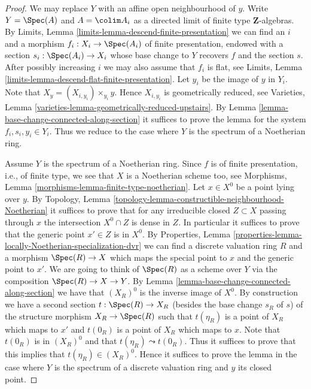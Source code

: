 \begin{proof}
We may replace $Y$ with an affine open neighbourhood of $y$.
Write $Y = \Spec(A)$ and $A = \colim A_i$ as a directed
limit of finite type $\mathbf{Z}$-algebras. By
Limits, Lemma \ref{limits-lemma-descend-finite-presentation}
we can find an $i$ and a morphism $f_i : X_i \to \Spec(A_i)$ of
finite presentation, endowed with a section $s_i : \Spec(A_i) \to X_i$
whose base change to $Y$ recovers $f$ and the section $s$.
After possibly increasing $i$ we may also assume that $f_i$ is flat, see
Limits, Lemma \ref{limits-lemma-descend-flat-finite-presentation}.
Let $y_i$ be the image of $y$ in $Y_i$. Note that
$X_y = (X_{i, y_i}) \times_{y_i} y$. Hence $X_{i, y_i}$ is geometrically
reduced, see
Varieties, Lemma \ref{varieties-lemma-geometrically-reduced-upstairs}.
By
Lemma \ref{lemma-base-change-connected-along-section}
it suffices to prove the lemma for the system $f_i, s_i, y_i \in Y_i$.
Thus we reduce to the case where $Y$ is the spectrum of a Noetherian ring.

\medskip\noindent
Assume $Y$ is the spectrum of a Noetherian ring.
Since $f$ is of finite presentation,
i.e., of finite type, we see that $X$ is a Noetherian scheme too, see
Morphisms, Lemma \ref{morphisms-lemma-finite-type-noetherian}.
Let $x \in X^0$ be a point lying over $y$. By
Topology, Lemma \ref{topology-lemma-constructible-neighbourhood-Noetherian}
it suffices to prove that for any irreducible closed $Z \subset X$
passing through $x$ the intersection $X^0 \cap Z$ is dense in $Z$.
In particular it suffices to prove that the generic point $x' \in Z$
is in $X^0$. By
Properties, Lemma \ref{properties-lemma-locally-Noetherian-specialization-dvr}
we can find a discrete valuation ring $R$ and a morphism
$\Spec(R) \to X$ which maps the special point to $x$ and
the generic point to $x'$. We are going to think of $\Spec(R)$
as a scheme over $Y$ via the composition $\Spec(R) \to X \to Y$. By
Lemma \ref{lemma-base-change-connected-along-section}
we have that $(X_R)^0$ is the inverse image of $X^0$.
By construction we have a second section $t : \Spec(R) \to X_R$
(besides the base change $s_R$ of $s$)
of the structure morphism $X_R \to \Spec(R)$ such that
$t(\eta_R)$ is a point of $X_R$ which maps to $x'$ and
$t(0_R)$ is a point of $X_R$ which maps to $x$. Note that
$t(0_R)$ is in $(X_R)^0$ and that $t(\eta_R) \leadsto t(0_R)$.
Thus it suffices to prove that this implies that $t(\eta_R) \in (X_R)^0$.
Hence it suffices to prove the lemma in the case where $Y$
is the spectrum of a discrete valuation ring and $y$ its closed point.


\end{proof}
